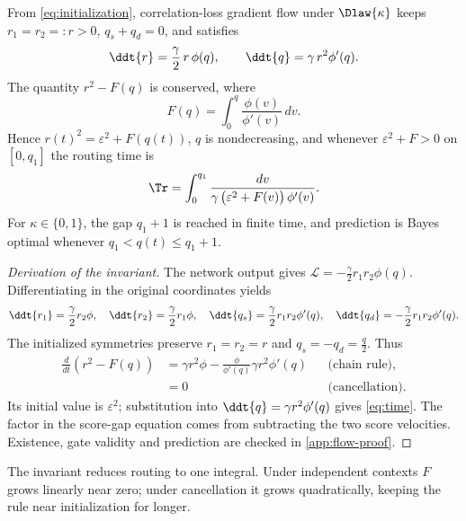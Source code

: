 \begin{lemma}
\label{lem:invariant}
From \cref{eq:initialization}, correlation-loss gradient flow under $\Dlaw{\kappa}$ keeps $r_1=r_2=:r>0$, $q_s+q_d=0$, and satisfies
\[
 \ddt{r}=\frac{\gamma}{2}\,r\,\phi(q),\qquad \ddt{q}=\gamma\,r^2\phi'(q).
\]
The quantity $r^2-F(q)$ is conserved, where
\[
 F(q)=\int_0^q\frac{\phi(v)}{\phi'(v)}\,dv.
\]
Hence $r(t)^2=\varepsilon^2+F(q(t))$, $q$ is nondecreasing, and whenever $\varepsilon^2+F>0$ on $[0,q_1]$ the routing time is
\begin{equation}
 \Tr=\int_0^{q_1}\frac{dv}{\gamma\,\bigl(\varepsilon^2+F(v)\bigr)\,\phi'(v)}.
 \label{eq:time}
\end{equation}
For $\kappa\in\{0,1\}$, the gap $q_1+1$ is reached in finite time, and prediction is Bayes optimal whenever $q_1<q(t)\le q_1+1$.
\end{lemma}
\begin{proof}[Derivation of the invariant]
The network output gives $\mathcal L=-\tfrac{\gamma}{2}r_1r_2\phi(q)$.
Differentiating in the original coordinates yields
\[
 \ddt{r_1}=\frac{\gamma}{2}r_2\phi,\quad
 \ddt{r_2}=\frac{\gamma}{2}r_1\phi,\quad
 \ddt{q_s}=\frac{\gamma}{2}r_1r_2\phi'(q),\quad
 \ddt{q_d}=-\frac{\gamma}{2}r_1r_2\phi'(q).
\]
The initialized symmetries preserve $r_1=r_2=r$ and $q_s=-q_d=\tfrac{q}{2}$.
Thus
\begin{align*}
 \frac{d}{dt}(r^2-F(q))
 &=\gamma r^2\phi-\frac{\phi}{\phi'(q)}\gamma r^2\phi'(q)
 &&\text{(chain rule)},\\
 &=0 &&\text{(cancellation)}.
\end{align*}
Its initial value is $\varepsilon^2$; substitution into $\ddt{q}=\gamma r^2\phi'(q)$ gives \cref{eq:time}.
The factor in the score-gap equation comes from subtracting the two score velocities.
Existence, gate validity and prediction are checked in \cref{app:flow-proof}.
\end{proof}


The invariant reduces routing to one integral. Under independent contexts $F$ grows linearly near zero;
under cancellation it grows quadratically, keeping the rule near initialization for longer.

